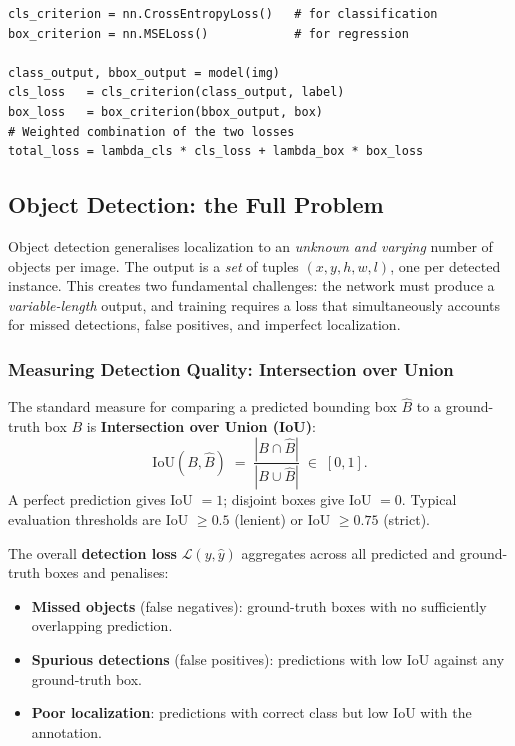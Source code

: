 \documentclass[11pt,a4paper]{article}
\newcommand{\term}[1]{\textcolor{DefGreen}{\textbf{#1}}}
\begin{document}
\begin{lstlisting}[style=pythonstyle, caption={Multi-task loss computation}]
cls_criterion = nn.CrossEntropyLoss()   # for classification
box_criterion = nn.MSELoss()            # for regression

class_output, bbox_output = model(img)
cls_loss   = cls_criterion(class_output, label)
box_loss   = box_criterion(bbox_output, box)
# Weighted combination of the two losses
total_loss = lambda_cls * cls_loss + lambda_box * box_loss
\end{lstlisting}

\subsection{Object Detection: the Full Problem}
\label{sec:object_detection}

Object detection generalises localization to an \emph{unknown and varying} number of objects per image. The output is a \emph{set} of tuples $(x, y, h, w, l)$, one per detected instance. This creates two fundamental challenges: the network must produce a \emph{variable-length} output, and training requires a loss that simultaneously accounts for missed detections, false positives, and imperfect localization.

\subsubsection{Measuring Detection Quality: Intersection over Union}

The standard measure for comparing a predicted bounding box $\hat{B}$ to a ground-truth box $B$ is \term{Intersection over Union (IoU)}:
\[
  \mathrm{IoU}(B, \hat{B}) \;=\; \frac{|B \cap \hat{B}|}{|B \cup \hat{B}|} \;\in\; [0,1].
\]
A perfect prediction gives IoU $= 1$; disjoint boxes give IoU $= 0$. Typical evaluation thresholds are IoU $\geq 0.5$ (lenient) or IoU $\geq 0.75$ (strict).

The overall \term{detection loss} $\mathcal{L}(y, \hat{y})$ aggregates across all predicted and ground-truth boxes and penalises:
\begin{itemize}
  \item \textbf{Missed objects} (false negatives): ground-truth boxes with no sufficiently overlapping prediction.
  \item \textbf{Spurious detections} (false positives): predictions with low IoU against any ground-truth box.
  \item \textbf{Poor localization}: predictions with correct class but low IoU with the annotation.
\end{itemize}
\end{document}
